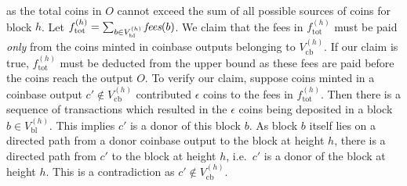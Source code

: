 as the total coins in $O$ cannot exceed the sum of all possible sources of coins for block $h$. Let $f_{\text{tot}}^{(h)} = \sum_{b \in V_{\text{bl}}^{(h)}} \textit{fees}(b)$. We claim that the fees in $f_{\text{tot}}^{(h)}$ must be paid \textit{only} from the coins minted in coinbase outputs belonging to $V_{\text{cb}}^{(h)}$. If our claim is true, $f_{\text{tot}}^{(h)}$ must be deducted from the upper bound as these fees are paid before the coins reach the output $O$. To verify our claim, suppose coins minted in a coinbase output $c' \not\in V_{\text{cb}}^{(h)}$ contributed $\epsilon$ coins to the fees in $f_{\text{tot}}^{(h)}$. Then there is a sequence of transactions which resulted in the $\epsilon$ coins being deposited in a block $b \in V_{\text{bl}}^{(h)}$. This implies $c'$ is a donor of this block $b$. As block $b$ itself lies on a directed path from a donor coinbase output to the block at height $h$, there is a directed path from $c'$ to the block at height $h$, i.e.~$c'$ is a donor of the block at height $h$. This is a contradiction as $c' \not\in V_{\text{cb}}^{(h)}$.


